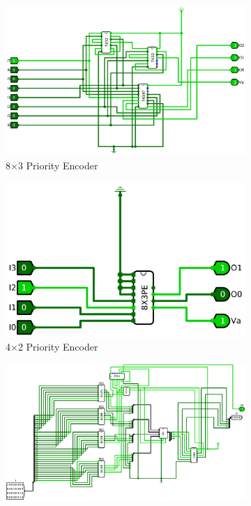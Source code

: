 \documentclass[12pt]{article}
\begin{document}
\begin{figure}[H]
    \centering
    \begin{subfigure}[b]{0.45\textwidth}
        \includegraphics[width=\textwidth]{Images/8X3PriorityEncoder.png}
        \caption{8$\times$3 Priority Encoder}
        \label{fig:8xprioenc}
    \end{subfigure}
    \begin{subfigure}[b]{0.45\textwidth}
        \includegraphics[width=\textwidth]{Images/4X2PriorityEncoder.png}
        \caption{4$\times$2 Priority Encoder}
        \label{fig:4x2prioenc}
    \end{subfigure}
    \newline
    \newline
    \begin{subfigure}[b]{0.9\textwidth}
        \includegraphics[width=\textwidth]{Images/ShiftFinder.png}

\end{subfigure}
\end{figure}
\end{document}
